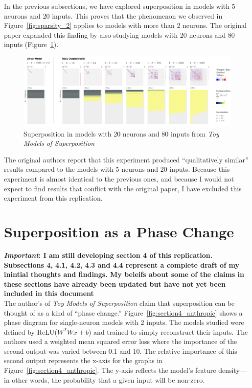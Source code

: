 \documentclass{article} %
\begin{document}
In the previous subsections, we have explored superposition in models with 5
neurons and 20 inputs. This proves that the phenomenon we observed in Figure~\ref{fig:sparsity_2}
applies to models with more than 2 neurons. The original paper expanded this 
finding by also studying models with 20 neurons and 80 inputs (Figure~\ref{fig:section3_anthropic2}). \\

\begin{figure}[h]
    \centering
    \includegraphics[width=0.99\linewidth]{demonstrating_superposition/images/anthropic_section3_part2.png}
    \captionsetup{font=footnotesize, width=0.7\linewidth} %
    \caption{
        Superposition in models with 20 neurons and 80 inputs from \textit{Toy Models of Superposition}\cite{elhage2022toy}
    }
    \label{fig:section3_anthropic2}
\end{figure}

The original authors report that this experiment produced ``qualitatively similar''
results compared to the models with 5 neurons and 20 inputs. Because this experiment 
is almost identical to the previous ones, and because I would not expect to find 
results that conflict with the original paper, I have excluded this experiment 
from this replication. \\

\section{Superposition as a Phase Change}

\textbf{\textit{Important}: I am still developing section 4 of this replication. 
Subsections 4, 4.1, 4.2, 4.3 and 4.4 represent a complete draft of my inintial 
thoughts and findings. My beleifs about some of the claims in these sections
have already been updated but have not yet been included in this document} \\

The author's of \textit{Toy Models of Superposition} claim that superposition
can be thought of as a kind of ``phase change.'' Figure~\ref{fig:section4_anthropic}
shows a phase diagram for single-neuron models with 2 inputs. The models studied were
defined by ReLU($W^TWx + b$) and trained to simply reconstruct their inputs. The authors 
used a weighted mean squared error loss where the importance of 
the second output was varied between 0.1 and 10. The relative importance of this
second output represents the x-axis for the graphs in Figure~\ref{fig:section4_anthropic}.
The y-axis reflects the model's feature density---in other words, the probability
that a given input will be non-zero.
\end{document}
